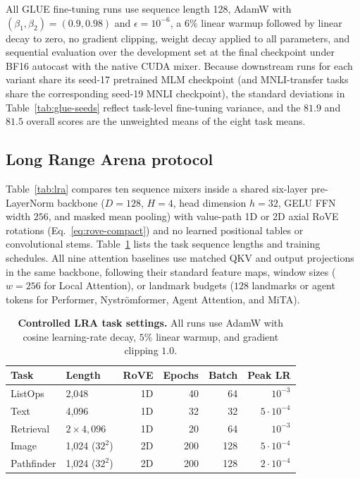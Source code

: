 \documentclass[10pt,twocolumn]{article}
\let\draftsmall\small
\renewcommand{\small}{\draftsmall\fontsize{9}{10}\selectfont}
\begin{document}
All GLUE fine-tuning runs use sequence length 128, AdamW with
$(\beta_1,\beta_2)=(0.9,0.98)$ and $\epsilon=10^{-6}$, a $6\%$ linear warmup
followed by linear decay to zero, no gradient clipping, weight decay applied
to all parameters, and sequential evaluation over the development set at the
final checkpoint under BF16 autocast with the native CUDA mixer.
Because downstream runs for each variant share its seed-17 pretrained MLM
checkpoint (and MNLI-transfer tasks share the corresponding seed-19 MNLI
checkpoint), the standard deviations in Table~\ref{tab:glue-seeds} reflect
task-level fine-tuning variance, and the $81.9$ and $81.5$ overall scores are
the unweighted means of the eight task means.

\FloatBarrier
\subsection{Long Range Arena protocol}
\label{app:lra}

Table~\ref{tab:lra} compares ten sequence mixers inside a shared six-layer
pre-LayerNorm backbone ($D=128$, $H=4$, head dimension $h=32$, GELU FFN width
$256$, and masked mean pooling) with value-path 1D or 2D axial RoVE rotations
(Eq.~\eqref{eq:rove-compact}) and no learned positional tables or convolutional
stems.
Table~\ref{tab:lra-recipe} lists the task sequence lengths and training
schedules.
All nine attention baselines use matched QKV and output projections in the
same backbone, following their standard feature maps, window sizes ($w=256$ for
Local Attention), or landmark budgets ($128$ landmarks or agent tokens for
Performer, Nystr\"omformer, Agent Attention, and MiTA).

\begin{table}[!ht]
\centering
\small
\captionsetup{width=.72\linewidth}
\setlength{\tabcolsep}{9pt}
\renewcommand{\arraystretch}{1.04}
\begin{tabular}{llrrrr}
\toprule
Task & Length & RoVE & Epochs & Batch & Peak LR\\
\midrule
ListOps & 2,048 & 1D & 40 & 64 & $10^{-3}$\\
Text & 4,096 & 1D & 32 & 32 & $5\cdot10^{-4}$\\
Retrieval & $2\times4{,}096$ & 1D & 20 & 64 & $10^{-3}$\\
Image & 1,024 ($32^2$) & 2D & 200 & 128 & $5\cdot10^{-4}$\\
Pathfinder & 1,024 ($32^2$) & 2D & 200 & 128 & $2\cdot10^{-4}$\\
\bottomrule
\end{tabular}
\caption{\textbf{Controlled LRA task settings.}
All runs use AdamW with cosine learning-rate decay, $5\%$ linear warmup, and
gradient clipping $1.0$.}
\label{tab:lra-recipe}
\end{table}
\end{document}
